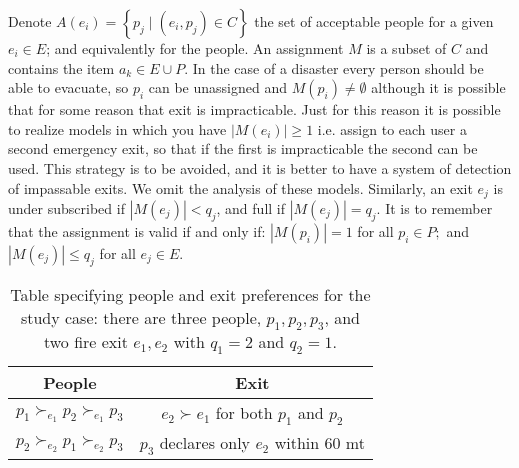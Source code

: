 \documentclass[letterpaper]{article} %
\begin{document}
    Denote \( A \left( e _ { i } \right) = \left\{ p _ { j } \mid \left( e _ { i } , p _ { j } \right) \in C \right\} \)
    the set of acceptable people for a given \( e _ { i } \in E \); and equivalently for the people.
    An assignment \(M\) is a subset of \(C\) and contains the item \( a _ { k } \in E \cup P \).
    In the case of a disaster every person should be able to evacuate, so  \( p _ { i } \) can be unassigned and
    \( M \left( p _ { i } \right) \neq \emptyset \) although it is possible that for some reason that exit is impracticable.
    Just for this reason it is possible to realize models in which you have \(|M \left( e _ { i } \right)| \geq 1\)
    i.e. assign to each user a second emergency exit, so that if the first is impracticable the second can be used.
    This strategy is to be avoided, and it is better to have a system of detection of impassable exits.
    We omit the analysis of these models.
    Similarly, an exit \( e _ { j } \) is  under subscribed if
    \( \left| M \left( e _ { j } \right) \right| < q _ { j } \), and full if
    \( \left| M \left( e _ { j } \right) \right| = q _ { j } \).
    It is to remember that the assignment is valid if and only if:
    \( \left| M \left( p _ { i } \right) \right| = 1 \) for all \( p _ { i } \in P ; \) and
    \( \left| M \left( e _ { j } \right) \right| \leq q _ { j } \) for all \( e _ { j } \in E  \).

    \begin{table}[!htb]
        \begin{tabular}{c|c}
            \hline People                                             & Exit                                                       \\
            \hline\( p_{1} \succ_{e_{1}} p_{2} \succ_{e_{1}} p_{3} \) & \( e_{2} \succ e_{1} \) for both \( p_{1} \) and \( p_{2} \) \\
            \( p_{2} \succ_{e_{2}} p_{1} \succ_{e_{2}} p_{3} \)       & \( p_{3} \) declares only \( e_{2} \) within 60 mt         \\
            \hline
        \end{tabular}
        \caption{Table specifying people and exit preferences for
            the study case: there are three people, \( p _ { 1 } , p _ { 2 } , p _ { 3 } \), and two fire exit
            \( e _ { 1 } , e _ { 2 } \) with \( q _ { 1 } = 2 \) and \( q _ { 2 } = 1 \).}
        \label{tab:people-exit}
    \end{table}
\end{document}

